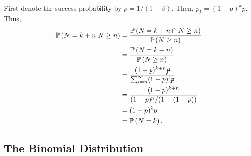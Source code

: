\begin{enumerate}
\begin{pf}
First denote the success probability by \(p=1/(1+\beta)\). Then,
\(p_k=(1-p)^kp\). Thus,
\begin{align*}
\mathbb{P}\left(N=k+n|N\ge n\right)
&=\frac{\mathbb{P}\left(N=k+n\cap N\ge n\right)}{\mathbb{P}\left(N\ge n\right)} \\
&=\frac{\mathbb{P}\left(N=k+n\right)}{\mathbb{P}\left(N\ge n\right)} \\
&=\frac{(1-p)^{k+n}\cancel{p}}{\sum_{i=n}^{\infty}(1-p)^i\cancel{p}} \\
&=\frac{(1-p)^{k+n}}{(1-p)^n/(1-(1-p))} \\
&=(1-p)^kp\\
&=\mathbb{P}\left(N=k\right).
\end{align*}
\end{pf}
\end{enumerate}
\subsection{The Binomial Distribution}
